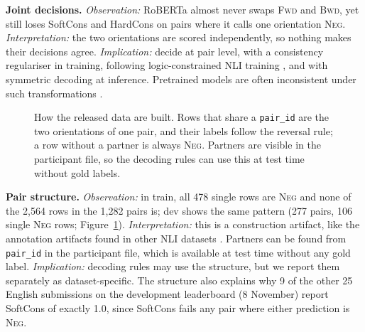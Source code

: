 \documentclass[10pt,a4paper,twocolumn]{article}
\newcommand{\Fwd}{\textsc{Fwd}}
\newcommand{\Bwd}{\textsc{Bwd}}
\newcommand{\Neg}{\textsc{Neg}}
\begin{document}
\textbf{Joint decisions.} \emph{Observation:} RoBERTa almost never swaps \Fwd{} and \Bwd, yet still loses SoftCons and HardCons on pairs where it calls one orientation \Neg. \emph{Interpretation:} the two orientations are scored independently, so nothing makes their decisions agree. \emph{Implication:} decide at pair level, with a consistency regulariser in training, following logic-constrained NLI training \citep{minervini2018adversarially,li2019logic}, and with symmetric decoding at inference. Pretrained models are often inconsistent under such transformations \citep{jang2022becel}.

\begin{figure}[!t]
\centering
{}
\caption{How the released data are built. Rows that share a \texttt{pair\_id} are the two orientations of one pair, and their labels follow the reversal rule; a row without a partner is always \Neg. Partners are visible in the participant file, so the decoding rules can use this at test time without gold labels.}
\label{fig:pairs}
\end{figure}

\textbf{Pair structure.} \emph{Observation:} in train, all 478 single rows are \Neg{} and none of the 2,564 rows in the 1,282 pairs is; dev shows the same pattern (277 pairs, 106 single \Neg{} rows; Figure~\ref{fig:pairs}). \emph{Interpretation:} this is a construction artifact, like the annotation artifacts found in other NLI datasets \citep{gururangan2018annotation}. Partners can be found from \texttt{pair\_id} in the participant file, which is available at test time without any gold label. \emph{Implication:} decoding rules may use the structure, but we report them separately as dataset-specific. The structure also explains why 9 of the other 25 English submissions on the development leaderboard (8 November) report SoftCons of exactly 1.0, since SoftCons fails any pair where either prediction is \Neg.
\end{document}
